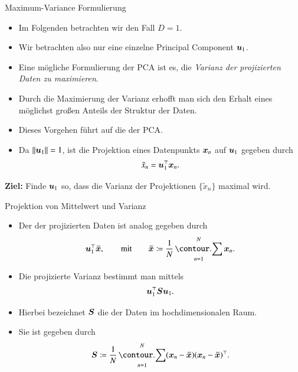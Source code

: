 \begin{frame}{Maximum-Variance Formulierung}{}
	\begin{itemize}
		\item Im Folgenden betrachten wir den Fall $D = 1$.
		\item Wir betrachten also nur eine einzelne Principal Component $\bm{u}_1$.
		\item Eine mögliche Formulierung der PCA ist es, die \textit{Varianz der projizierten Daten zu maximieren}.
		\item Durch die Maximierung der Varianz erhofft man sich den Erhalt eines möglichst großen Anteils
			der Struktur der Daten.
		\item Dieses Vorgehen führt auf die  der PCA.
		\item Da $\Vert \bm{u}_1 \Vert = 1$, ist die Projektion eines Datenpunkts $\bm{x}_n$ auf $\bm{u}_1$ gegeben durch
		\begin{equation} \label{eq:pca-projection-data}
			\tilde{x}_n = \bm{u}_1^\top \bm{x}_n.
		\end{equation}
	\end{itemize}

	\begin{boxGray}
		\textbf{Ziel:} Finde $\bm{u}_1$ so, dass die Varianz der Projektionen $\{ \tilde{x}_n \}$ maximal wird.
	\end{boxGray}
\end{frame}


\begin{frame}{Projektion von Mittelwert und Varianz}{}
	\begin{itemize}
		\item Der  der projizierten Daten ist analog gegeben durch
		\begin{equation} \label{eq:pca-projection-mean}
			\bu_1^\top \bxmean,
		\qquad\text{mit}\qquad
			\bxmean \coloneqq \frac{1}{N} \sum_{n=1}^N \bx_n.
		\end{equation}
		\item Die projizierte Varianz bestimmt man mittels
		\begin{equation} \label{eq:pca-projection-variance}
			\bm{u}_1^\top \bm{S} \bm{u}_1.
		\end{equation}
		\item Hierbei bezeichnet $\bm{S}$ die  der Daten im hochdimensionalen Raum.
		\item Sie ist gegeben durch
		\begin{equation} \label{eq:pca-scatter-matrix}
			\bS \coloneqq \frac{1}{N} \sum_{n=1}^N (\bx_n - \bxmean) (\bx_n - \bxmean)^\top.
		\end{equation}
	\end{itemize}
\end{frame}


